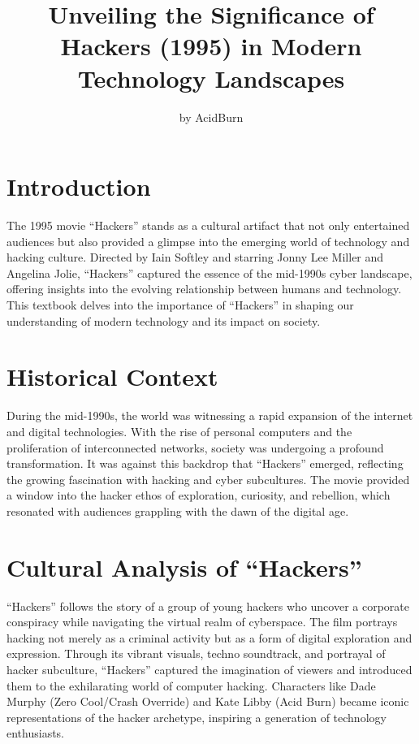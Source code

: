 \documentclass[
  openany]{book}
\title{Unveiling the Significance of Hackers (1995) in Modern Technology Landscapes}
\author{by AcidBurn}
\date{}
\begin{document}
\maketitle

{
\setcounter{tocdepth}{1}
\tableofcontents
}
\hypertarget{introduction}{%
\chapter{Introduction}\label{introduction}}

The 1995 movie ``Hackers'' stands as a cultural artifact that not only entertained audiences but also provided a glimpse into the emerging world of technology and hacking culture. Directed by Iain Softley and starring Jonny Lee Miller and Angelina Jolie, ``Hackers'' captured the essence of the mid-1990s cyber landscape, offering insights into the evolving relationship between humans and technology. This textbook delves into the importance of ``Hackers'' in shaping our understanding of modern technology and its impact on society.

\hypertarget{historical-context}{%
\chapter{Historical Context}\label{historical-context}}

During the mid-1990s, the world was witnessing a rapid expansion of the internet and digital technologies. With the rise of personal computers and the proliferation of interconnected networks, society was undergoing a profound transformation. It was against this backdrop that ``Hackers'' emerged, reflecting the growing fascination with hacking and cyber subcultures. The movie provided a window into the hacker ethos of exploration, curiosity, and rebellion, which resonated with audiences grappling with the dawn of the digital age.

\hypertarget{cultural-analysis-of-hackers}{%
\chapter{Cultural Analysis of ``Hackers''}\label{cultural-analysis-of-hackers}}

``Hackers'' follows the story of a group of young hackers who uncover a corporate conspiracy while navigating the virtual realm of cyberspace. The film portrays hacking not merely as a criminal activity but as a form of digital exploration and expression. Through its vibrant visuals, techno soundtrack, and portrayal of hacker subculture, ``Hackers'' captured the imagination of viewers and introduced them to the exhilarating world of computer hacking. Characters like Dade Murphy (Zero Cool/Crash Override) and Kate Libby (Acid Burn) became iconic representations of the hacker archetype, inspiring a generation of technology enthusiasts.
\end{document}
